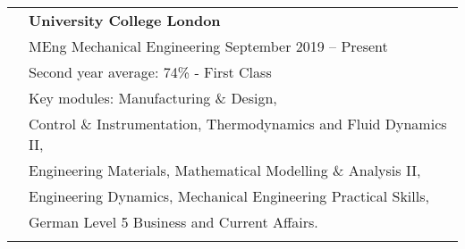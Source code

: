 \documentclass[letterpaper, 11pt]{article}
\begin{document}
\begin{longtable}{p{1.3in}p{4.8in}}




    \color{OliveGreen}{Education}
     & \textbf{University College London}                                                                                                                                                                                 \\
     & MEng Mechanical Engineering \hfill September 2019 -- Present                                                                                                                                                       \\
     & Second year average: 74\% - First Class                                                                                                                                                                            \\
     & Key modules: Manufacturing \& Design,                                                                                                                                                                              \\
     & Control \& Instrumentation, Thermodynamics and Fluid Dynamics II,                                                                                                                                                  \\
     & Engineering Materials, Mathematical Modelling \& Analysis II,                                                                                                                                                      \\
     & Engineering Dynamics, Mechanical Engineering Practical Skills,                                                                                                                                                     \\
     & German Level 5 Business and Current Affairs.                                                                                                                                                                       \\
     &                                                                                                                                                                                                                    \\


\end{longtable}
\end{document}
